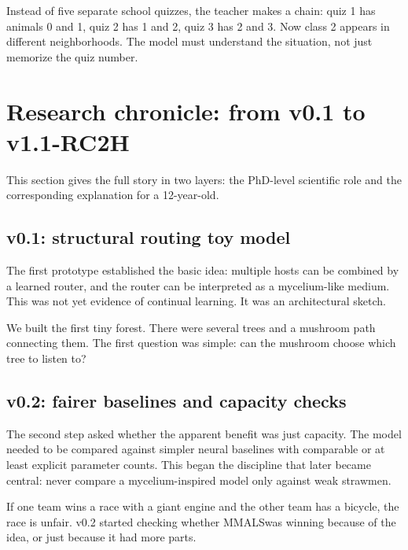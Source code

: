 \documentclass[11pt]{article}
\newcommand{\mmals}{\textsc{MMALS}}
\begin{document}
\begin{kidbox}
Instead of five separate school quizzes, the teacher makes a chain: quiz 1 has animals 0 and 1, quiz 2 has 1 and 2, quiz 3 has 2 and 3. Now class 2 appears in different neighborhoods. The model must understand the situation, not just memorize the quiz number.
\end{kidbox}

\section{Research chronicle: from v0.1 to v1.1-RC2H}

This section gives the full story in two layers: the PhD-level scientific role and the corresponding explanation for a 12-year-old.

\subsection{v0.1: structural routing toy model}

The first prototype established the basic idea: multiple hosts can be combined by a learned router, and the router can be interpreted as a mycelium-like medium. This was not yet evidence of continual learning. It was an architectural sketch.

\begin{kidbox}
We built the first tiny forest. There were several trees and a mushroom path connecting them. The first question was simple: can the mushroom choose which tree to listen to?
\end{kidbox}

\subsection{v0.2: fairer baselines and capacity checks}

The second step asked whether the apparent benefit was just capacity. The model needed to be compared against simpler neural baselines with comparable or at least explicit parameter counts. This began the discipline that later became central: never compare a mycelium-inspired model only against weak strawmen.

\begin{kidbox}
If one team wins a race with a giant engine and the other team has a bicycle, the race is unfair. v0.2 started checking whether \mmals was winning because of the idea, or just because it had more parts.
\end{kidbox}
\end{document}
